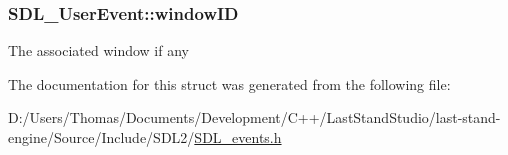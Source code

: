 \subsubsection[{window\+I\+D}]{ S\+D\+L\+\_\+\+User\+Event\+::window\+I\+D}\label{structSDL__UserEvent_abccefa10e0e0e3a0801bc6d836a08da7}
The associated window if any 

The documentation for this struct was generated from the following file\+:\begin{DoxyCompactItemize}
\item 
D\+:/\+Users/\+Thomas/\+Documents/\+Development/\+C++/\+Last\+Stand\+Studio/last-\/stand-\/engine/\+Source/\+Include/\+S\+D\+L2/\hyperlink{SDL__events_8h}{S\+D\+L\+\_\+events.\+h}\end{DoxyCompactItemize}
